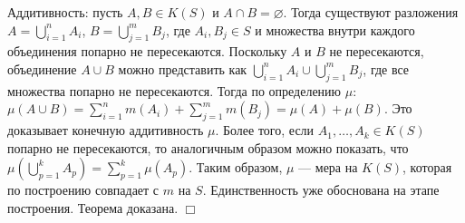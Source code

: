 \documentclass[12pt]{article}
\begin{document}
Аддитивность: пусть $A, B \in K(S)$ и $A \cap B = \varnothing$. Тогда существуют разложения $A = \bigcup_{i=1}^{n} A_i$, $B = \bigcup_{j=1}^{m} B_j$, где $A_i, B_j \in S$ и множества внутри каждого объединения попарно не пересекаются. Поскольку $A$ и $B$ не пересекаются, объединение $A \cup B$ можно представить как $\bigcup_{i=1}^{n} A_i \cup \bigcup_{j=1}^{m} B_j$, где все множества попарно не пересекаются. Тогда по определению $\mu$: $\mu(A \cup B) = \sum_{i=1}^{n} m(A_i) + \sum_{j=1}^{m} m(B_j) = \mu(A) + \mu(B)$. Это доказывает конечную аддитивность $\mu$. Более того, если $A_1, \ldots, A_k \in K(S)$ попарно не пересекаются, то аналогичным образом можно показать, что $\mu(\bigcup_{p=1}^{k} A_p) = \sum_{p=1}^{k} \mu(A_p)$. Таким образом, $\mu$ — мера на $K(S)$, которая по построению совпадает с $m$ на $S$. Единственность уже обоснована на этапе построения. Теорема доказана. \hfill $\Box$

\end{document}
